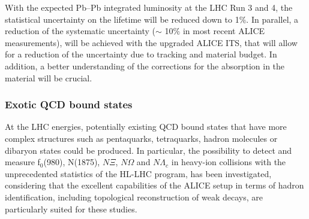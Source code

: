 With the expected Pb--Pb integrated luminosity at the LHC Run 3 and 4, the statistical uncertainty on the lifetime will be reduced down to 1$\%$. 
In parallel, a reduction of the systematic uncertainty ($\sim$ 10$\%$ in most recent ALICE measurements), will be achieved with the upgraded 
ALICE ITS, that will allow for a reduction of the uncertainty due to tracking and material budget. 
In addition, a better understanding of the corrections for the absorption in the material will be crucial. 

\subsubsection{Exotic QCD bound states}

At the LHC energies, potentially existing QCD bound states that have more complex structures such as pentaquarks, tetraquarks, hadron molecules or dibaryon states could be produced.
In particular, the possibility to detect and measure f$_{0}$(980), N(1875), $N\Xi$, $N\Omega$ and $N\Lambda_c$ in heavy-ion collisions with the unprecedented statistics of the HL-LHC program, has been investigated, considering that the excellent capabilities of the ALICE setup in terms of hadron identification, including topological reconstruction of weak decays, are particularly suited for these studies.

